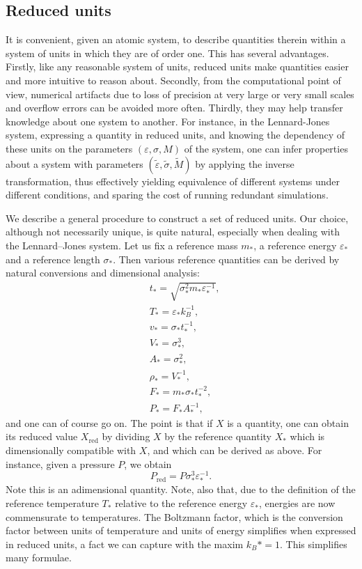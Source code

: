 \subsection{Reduced units}
It is convenient, given an atomic system, to describe quantities therein within a system of units in which they are of order one. This has several advantages. 
Firstly, like any reasonable system of units, reduced units make quantities easier and more intuitive to reason about.
Secondly, from the computational point of view, numerical artifacts due to loss of precision at very large or very small scales and overflow errors can be avoided more often.
Thirdly, they may help transfer knowledge about one system to another. 
For instance, in the Lennard-Jones system, expressing a quantity in reduced units,
and knowing the dependency of these units on the parameters $(\varepsilon,\sigma,M)$ of the system, one can infer properties about a system with parameters $(\tilde\varepsilon,\tilde\sigma,\tilde M)$ by applying the inverse transformation, thus effectively yielding equivalence of different systems under different conditions, and sparing the cost of running redundant simulations.

We describe a general procedure to construct a set of reduced units. Our choice, although not necessarily unique, is quite natural, especially when dealing with the Lennard--Jones system.
Let us fix a reference mass $m_*$, a reference energy $\varepsilon_*$ and a reference length $\sigma _*$. Then various reference quantities can be derived by natural conversions and dimensional analysis:
\begin{align*}&t_*=\sqrt{\sigma_*^2m_*\varepsilon_*^{-1}},\tag{time}\\
    &T_*=\varepsilon_*k_B^{-1},\tag{temperature}\\
    &v_*=\sigma_*t_*^{-1},\tag{velocity}\\
    &V_*=\sigma_*^3,\tag{volume}\\
    &A_*=\sigma_*^2,\tag{area}\\
    &\rho_*=V_*^{-1},\tag{density}\\
    &F_*=m_*\sigma_*t_*^{-2},\tag{force}\\
    &P_*=F_*A_*^{-1},\tag{pressure}
\end{align*}
and one can of course go on. The point is that if $X$ is a quantity, one can obtain its reduced value $X_{\mathrm{red}}$ by dividing $X$ by the reference quantity $X_*$ which is dimensionally compatible with $X$, and which can be derived as above.
For instance, given a pressure $P$, we obtain
$$P_{\mathrm{red}}= P\sigma_*^3\varepsilon_*^{-1}.$$
Note this is an adimensional quantity. Note, also that, due to the definition of the reference temperature $T_*$ relative to the reference energy $\varepsilon_*$, energies are now commensurate to temperatures.
The Boltzmann factor, which is the conversion factor between units of temperature and units of energy simplifies when expressed in reduced units, a fact we can capture with the maxim ${k_B}*=1$. This simplifies many formulae.

